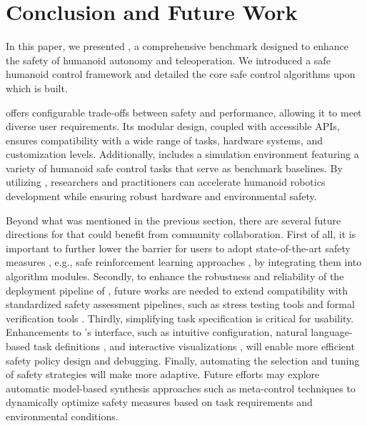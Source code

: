 \section{Conclusion and Future Work}
In this paper, we presented \spark, a comprehensive benchmark designed to enhance the safety of humanoid autonomy and teleoperation. We introduced a safe humanoid control framework and detailed the core safe control algorithms upon which \spark is built.

\spark offers configurable trade-offs between safety and performance, allowing it to meet diverse user requirements. Its modular design, coupled with accessible APIs, ensures compatibility with a wide range of tasks, hardware systems, and customization levels. Additionally, \spark includes a simulation environment featuring a variety of humanoid safe control tasks that serve as benchmark baselines. By utilizing \spark, researchers and practitioners can accelerate humanoid robotics development while ensuring robust hardware and environmental safety.


Beyond what was mentioned in the previous section, there are several future directions for \spark that could benefit from community collaboration. 
First of all, it is important to further lower the barrier for users to adopt state-of-the-art safety measures \cite{ji2023safety}, e.g., safe reinforcement learning approaches \cite{zhao2023absolute}\cite{zhao2023learn}\cite{zhao2023state} \cite{yao2024constraint}, by integrating them into \spark algorithm modules. 
Secondly, to enhance the robustness and reliability of the deployment pipeline of \spark, future works are needed to extend \spark compatibility with standardized safety assessment pipelines, such as stress testing tools and formal verification tools \cite{xie2024framework}. 
Thirdly, simplifying task specification is critical for usability. Enhancements to \spark's interface, such as intuitive configuration, natural language-based task definitions \cite{lin2023text2motion}, and interactive visualizations \cite{park2024dexhub}, will enable more efficient safety policy design and debugging. 
Finally, automating the selection and tuning \cite{victoria2021automatic} of safety strategies will make \spark more adaptive. Future efforts may explore automatic model-based synthesis approaches such as meta-control \cite{wei2024metacontrol} techniques to dynamically optimize safety measures based on task requirements and environmental conditions. 